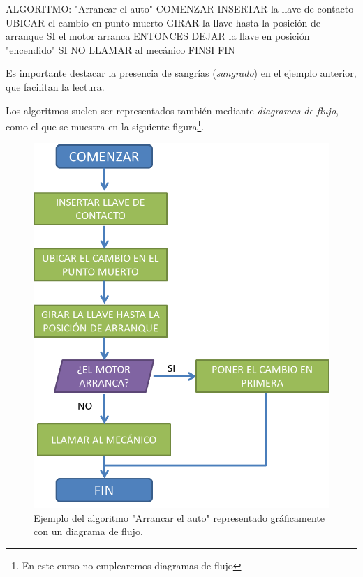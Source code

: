 \documentclass[
]{book}
\newenvironment{Shaded}{\begin{snugshade}}{\end{snugshade}}
\newcommand{\NormalTok}[1]{#1}
\begin{document}
\begin{Shaded}
\begin{Highlighting}[]
\NormalTok{ALGORITMO: "Arrancar el auto"}
\NormalTok{COMENZAR}
\NormalTok{    INSERTAR la llave de contacto}
\NormalTok{    UBICAR el cambio en punto muerto}
\NormalTok{    GIRAR la llave hasta la posición de arranque}
\NormalTok{    SI el motor arranca }
\NormalTok{        ENTONCES}
\NormalTok{            DEJAR la llave en posición "encendido"}
\NormalTok{        SI NO}
\NormalTok{            LLAMAR al mecánico}
\NormalTok{    FINSI}
\NormalTok{FIN}
\end{Highlighting}
\end{Shaded}

Es importante destacar la presencia de sangrías (\emph{sangrado}) en el ejemplo anterior, que facilitan la lectura.

Los algoritmos suelen ser representados también mediante \emph{diagramas de flujo}, como el que se muestra en la siguiente figura\footnote{En este curso no emplearemos diagramas de flujo}.

\begin{figure}

{\centering \includegraphics[width=0.7\linewidth]{images/intro/flujo} 

}

\caption{Ejemplo del algoritmo "Arrancar el auto" representado gráficamente con un diagrama de flujo.}\label{fig:algoritmo}
\end{figure}
\end{document}

